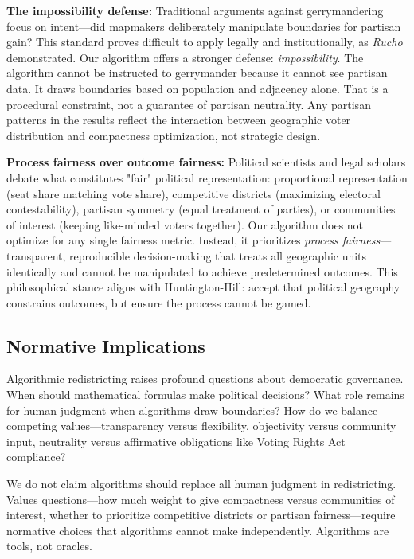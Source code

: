 \textbf{The impossibility defense:} Traditional arguments against gerrymandering focus on intent—did mapmakers deliberately manipulate boundaries for partisan gain? This standard proves difficult to apply legally and institutionally, as \textit{Rucho} demonstrated. Our algorithm offers a stronger defense: \textit{impossibility}. The algorithm cannot be instructed to gerrymander because it cannot see partisan data. It draws boundaries based on population and adjacency alone. That is a procedural constraint, not a guarantee of partisan neutrality. Any partisan patterns in the results reflect the interaction between geographic voter distribution and compactness optimization, not strategic design.

\textbf{Process fairness over outcome fairness:} Political scientists and legal scholars debate what constitutes "fair" political representation: proportional representation (seat share matching vote share), competitive districts (maximizing electoral contestability), partisan symmetry (equal treatment of parties), or communities of interest (keeping like-minded voters together). Our algorithm does not optimize for any single fairness metric. Instead, it prioritizes \textit{process fairness}—transparent, reproducible decision-making that treats all geographic units identically and cannot be manipulated to achieve predetermined outcomes. This philosophical stance aligns with Huntington-Hill: accept that political geography constrains outcomes, but ensure the process cannot be gamed.

\subsection{Normative Implications}

Algorithmic redistricting raises profound questions about democratic governance. When should mathematical formulas make political decisions? What role remains for human judgment when algorithms draw boundaries? How do we balance competing values—transparency versus flexibility, objectivity versus community input, neutrality versus affirmative obligations like Voting Rights Act compliance?

We do not claim algorithms should replace all human judgment in redistricting. Values questions—how much weight to give compactness versus communities of interest, whether to prioritize competitive districts or partisan fairness—require normative choices that algorithms cannot make independently. Algorithms are tools, not oracles.

